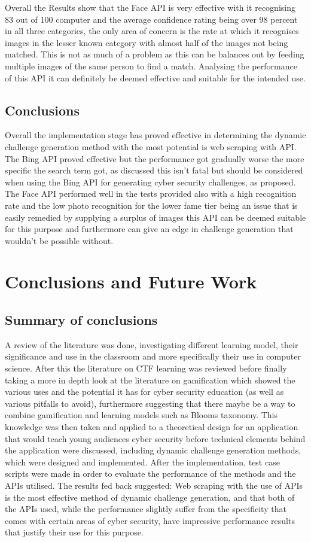 \documentclass[12pt,a4paper]{article}
\begin{document}
Overall the Results show that the Face API is very effective with it recognising 83 out of 100 computer and the average confidence rating being over 98 percent in all three categories, the only area of concern is the rate at which it recognises images in the lesser known category with almost half of the images not being matched. This is not as much of a problem as this can be balances out by feeding multiple images of the same person to find a match. Analysing the performance of this API it can definitely be deemed effective and suitable for the intended use.  

\subsection{Conclusions} 

Overall the implementation stage has proved effective in determining the dynamic challenge generation method with the most potential is web scraping with API. The Bing API proved effective but the performance got gradually worse the more specific the search term got, as discussed this isn't fatal but should be considered when using the Bing API for generating cyber security challenges, as proposed. The Face API performed well in the tests provided also with a high recognition rate and the low photo recognition for the lower fame tier being an issue that is easily remedied by supplying a surplus of images this API can be deemed suitable for this purpose and furthermore can give an edge in challenge generation that wouldn't be possible without. 


\newpage
\section{Conclusions and Future Work} 
\subsection{Summary of conclusions}
A review of the literature was done, investigating different learning model, their significance and use in the classroom and more specifically their use in computer science. After this the literature on CTF learning was reviewed before finally taking a more in depth look at the literature on gamification which showed the various uses and the potential it has for cyber security education (as well as various pitfalls to avoid), furthermore suggesting that there maybe be a way to combine gamification and learning models such as Blooms taxonomy. This knowledge was then taken and applied to a theoretical design for an application that would teach young audiences cyber security before technical elements behind the application were discussed, including dynamic challenge generation methods, which were designed and implemented. After the implementation, test case scripts were made in order to evaluate the performance of the methods and the APIs utilised. The results fed back suggested: Web scraping with the use of APIs is the most effective method of dynamic challenge generation, and that both of the APIs used, while the performance slightly suffer from the specificity  that comes with certain areas of cyber security, have impressive performance results that justify their use for this purpose.
\end{document}
